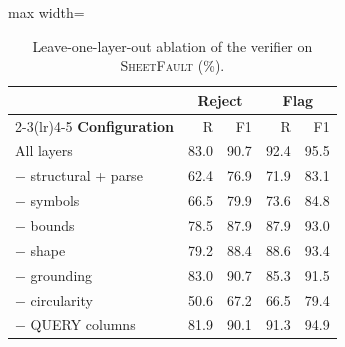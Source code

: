 \begin{table}
\caption{Leave-one-layer-out ablation of the verifier on \textsc{SheetFault} (\%).}
\label{tab:e1-ablation}

\centering\footnotesize
\begin{adjustbox}{max width=\columnwidth}\begin{tabular}{l rr rr}
\toprule
& \multicolumn{2}{c}{\textbf{Reject}} & \multicolumn{2}{c}{\textbf{Flag}} \\
\cmidrule(lr){2-3}\cmidrule(lr){4-5}
\textbf{Configuration} & R & F1 & R & F1 \\
\midrule
All layers & 83.0 & 90.7 & 92.4 & 95.5 \\
$-$ structural + parse & 62.4 & 76.9 & 71.9 & 83.1 \\
$-$ symbols & 66.5 & 79.9 & 73.6 & 84.8 \\
$-$ bounds & 78.5 & 87.9 & 87.9 & 93.0 \\
$-$ shape & 79.2 & 88.4 & 88.6 & 93.4 \\
$-$ grounding & 83.0 & 90.7 & 85.3 & 91.5 \\
$-$ circularity & 50.6 & 67.2 & 66.5 & 79.4 \\
$-$ QUERY columns & 81.9 & 90.1 & 91.3 & 94.9 \\
\bottomrule
\end{tabular}\end{adjustbox}
\end{table}
